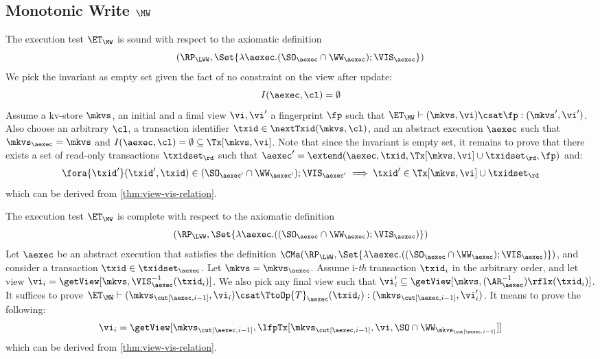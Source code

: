 \subsection{Monotonic Write \( \MW \)}
\label{sec:sound-complete-mw}

The execution test $\ET_\MW$ is sound with respect to the axiomatic definition 
\[(\RP_{\LWW}, \Set{\lambda \aexec. ( \SO_{\aexec} \cap \WW_\aexec ) ; \VIS_{\aexec} })\]
We pick the invariant as empty set given the fact of no constraint on the view after update:
\[ 
    I( \aexec, \cl ) = \emptyset 
\]
Assume a kv-store $\mkvs$, an initial and a final view $\vi, \vi'$  a fingerprint $\fp$ 
such that $\ET_{\MW} \vdash (\mkvs, \vi) \csat \fp: (\mkvs',\vi')$. 
Also choose an arbitrary $\cl$, a transaction identifier $\txid \in \nextTxid(\mkvs, \cl)$, 
and an abstract execution $\aexec$ such that $\mkvs_{\aexec} = \mkvs$ and 
\( I(\aexec, \cl) =  \emptyset \subseteq \Tx[\mkvs, \vi] \).
Note that since the invariant  is empty set, it remains to prove that there exists a set of read-only transactions \( \txidset_\rd \) such that
\( \aexec' = \extend(\aexec, \txid, \Tx[\mkvs, \vi] \cup \txidset_\rd, \fp ) \) and:
\[
    \begin{array}{@{}l@{}}
        \fora{ \txid' }  (\txid' ,\txid)  \in ( \SO_{\aexec'} \cap \WW_{\aexec'} ) ; \VIS_{\aexec'}
        \implies \txid' \in \Tx[\mkvs, \vi] \cup \txidset_\rd
    \end{array}
\]
which can be derived from \cref{thm:view-vis-relation}.

The execution test $\ET_{\MW}$ is complete with respect to 
the axiomatic definition
\[(\RP_{\LWW}, \Set{\lambda \aexec.(( \SO_{\aexec} \cap \WW_{\aexec} ) ; \VIS_{\aexec})})\]
Let $\aexec$ be an abstract execution that satisfies the definition
$\CMa(\RP_{\LWW}, \Set{\lambda \aexec.(( \SO_{\aexec} \cap \WW_{\aexec} ) ; \VIS_{\aexec})})$, 
and consider a transaction $\txid \in \txidset_{\aexec}$. 
Let \( \mkvs = \mkvs_\aexec \).
Assume i-\emph{th} transaction \( \txid_i \) in the arbitrary order,
and let view \( \vi_{i} = \getView[\mkvs, \VIS^{-1}_{\aexec}(\txid_{i})] \).
We also pick any final view such that \( \vi'_{i} \subseteq \getView[\mkvs, (\AR^{-1}_{\aexec})\rflx(\txid_{i})] \).
It suffices to prove \( \ET_\MW \vdash (\mkvs_{\cut[\aexec, i-1]}, \vi_i ) \csat  \TtoOp{T}_{\aexec}(\txid_{i}) : (\mkvs_{\cut[\aexec, i-1]}, \vi'_{i}) \).
It means to prove the following:
\[
    \vi_i = \getView[\mkvs_{\cut[\aexec, i-1]}, \lfpTx[\mkvs_{\cut[\aexec, i-1]},\vi,\SO \cap \WW_{\mkvs_{\cut[\aexec, i-1]}}]]
\]
which can be derived from \cref{thm:view-vis-relation}.
